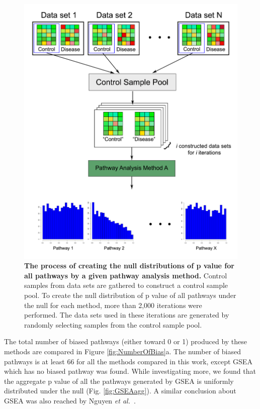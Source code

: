 \documentclass[Minh_PhD_thesis.tex]{subfiles}
\begin{document}
\begin{figure}
\centering
	\includegraphics[width=0.8\linewidth]{../Figures/Fig4}
  \caption{\textbf{The process of creating the null distributions of p value for all pathways by a given pathway analysis method.} Control samples from data sets are  gathered to construct a control sample pool. To create the null distribution of p value of all pathways under the null for each method, more than 2,000 iterations were performed. The data sets used in these iterations are generated by randomly selecting samples from the control sample pool.}
  \label{nullGeneration}
\end{figure}

The total number of biased pathways  (either toward 0 or 1) produced by these methods are compared in Figure \ref{fig:NumberOfBias}a.
The number of biased pathways is at least 66 for all the methods compared in this work, except GSEA which has no biased pathway was found. 
While investigating more, we found that the aggregate p value of all the pathways generated by GSEA is uniformly distributed under the null (Fig. \ref{fig:GSEAagg}).
A similar conclusion about GSEA was also reached by Nguyen \textit{et al.}~\cite{nguyen2017DANUBE}.
\end{document}
